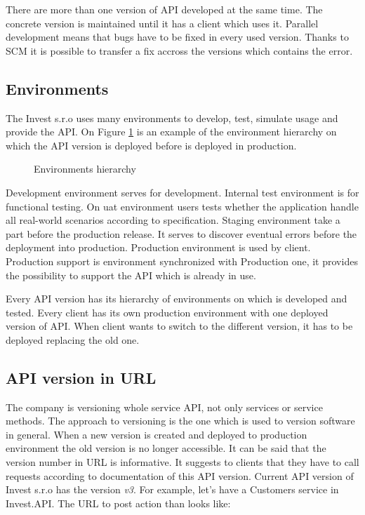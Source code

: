 There are more than one version of API developed at the same time. The concrete version is maintained until it has a client which uses it. Parallel development means that bugs have to be fixed in every used version. Thanks to SCM it is possible to transfer a fix accross the versions which contains the error. 

\subsection{Environments}
The Invest s.r.o uses many environments to develop, test, simulate usage and provide the API. On Figure \ref{fig:environments-hierarchy} is an example of the environment hierarchy on which the API version is deployed before is deployed in production.

\begin{figure}[htp] 
\caption{Environments hierarchy}
\label{fig:environments-hierarchy}
\end{figure} 

Development environment serves for development. Internal test environment is for functional testing. On \gls{uat} environment users tests whether the application handle all real-world scenarios according to specification. Staging environment take a part before the production release. It serves to discover eventual errors before the deployment into production. Production environment is used by client. Production support is environment synchronized with Production one, it provides the possibility to support the API which is already in use.

Every API version has its hierarchy of environments on which is developed and tested. Every client has its own production environment with one deployed version of API. When client wants to switch to the different version, it has to be deployed replacing the old one.

\subsection{API version in URL}
The company is versioning whole service API, not only services or service methods. The approach to versioning is the one which is used to version software in general. When a new version is created and deployed to production environment the old version is no longer accessible. It can be said that the version number in URL is informative. It suggests to clients that they have to call requests according to \gls{documentation} of this API version. Current API version of Invest s.r.o has the version \emph{v3}. For example, let's have a Customers service in Invest.API. The URL to post action than looks like:

